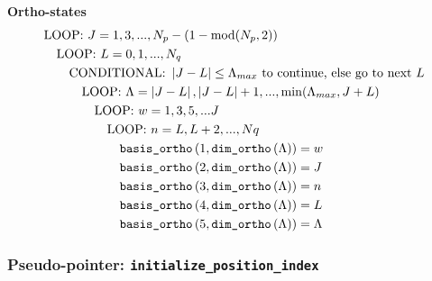 \documentclass[english,twoside, openright]{report}
\newcommand{\Abs}[1]{
  \left|#1\right|
}
\begin{document}
\textbf{Ortho-states}
\begin{align}
  &\text{LOOP: } J=1,3,..., N_p-(1-\text{mod}(N_p,2))
    \nonumber \\
  & \quad\text{LOOP: }L=0,1,...,N_q \nonumber \\
  & \quad\quad\text{CONDITIONAL: } \Abs{J-L}\leq \Lambda_{max} \text{ to
    continue, else go to next }L \nonumber \\
  &\quad\quad\quad\text{LOOP:
} \Lambda=\Abs{J-L},\Abs{J-L}+1,...,\min(\Lambda_{max},J+L) \nonumber
  \\
  &\quad\quad\quad\quad\text{LOOP: } w=1,3,5,...J \nonumber \\
  &\quad\quad\quad\quad\quad\text{LOOP: } n=L,L+2,...,Nq \\
  &\quad\quad\quad\quad\quad\quad
\text{\texttt{basis\_ortho}}\left(1,\text{\texttt{dim\_ortho}}\left(\Lambda\right)\right)=w
    \nonumber \\
  &\quad\quad\quad\quad\quad\quad
\text{\texttt{basis\_ortho}}\left(2,\text{\texttt{dim\_ortho}}\left(\Lambda\right)\right)=J
    \nonumber \\
  &\quad\quad\quad\quad\quad\quad
\text{\texttt{basis\_ortho}}\left(3,\text{\texttt{dim\_ortho}}\left(\Lambda\right)\right)=n
    \nonumber \\
  &\quad\quad\quad\quad\quad\quad
\text{\texttt{basis\_ortho}}\left(4,\text{\texttt{dim\_ortho}}\left(\Lambda\right)\right)=L
    \nonumber \\
  &\quad\quad\quad\quad\quad\quad
\text{\texttt{basis\_ortho}}\left(5,\text{\texttt{dim\_ortho}}\left(\Lambda\right)\right)=\Lambda
\nonumber
\end{align}

\subsubsection{Pseudo-pointer: \texttt{initialize\_position\_index}}
\end{document}
